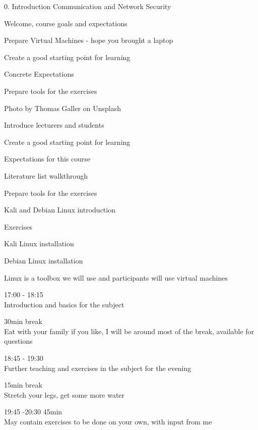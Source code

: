 \documentclass[Screen16to9,17pt]{foils}
\begin{document}
\mytitlepage
{0. Introduction}
{Communication and Network Security \the\year}

\hlkprofiluk



\begin{list2}
\item Welcome, course goals and expectations
\item Prepare Virtual Machines - hope you brought a laptop
\item Create a good starting point for learning
\item Concrete Expectations
\item Prepare tools for the exercises
\end{list2}

Photo by Thomas Galler on Unsplash


\begin{list2}
\item Introduce lecturers and students
\item Create a good starting point for learning
\item Expectations for this course
\item Literature list walkthrough
\item Prepare tools for the exercises
\item Kali and Debian Linux introduction
\end{list2}

Exercises
\begin{list2}
\item Kali Linux installation
\item Debian Linux installation
\end{list2}
Linux is a toolbox we will use and participants will use virtual machines




\begin{list2}
\item 17:00 - 18:15\\
Introduction and basics for the subject

\item 30min break\\
Eat with your family if you like, I will be around most of the break, available for questions

\item 18:45 - 19:30\\
Further teaching and exercises in the subject for the evening

\item 15min break\\
Stretch your legs, get some more water

\item 19:45 -20:30 45min\\
May contain exercises to be done on your own, with input from me
\end{list2}
\end{document}
